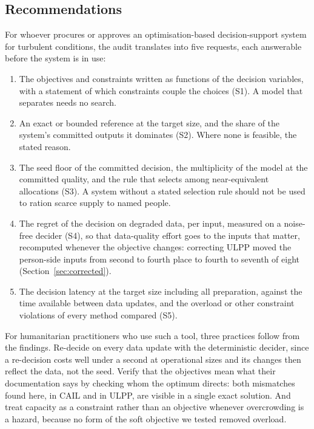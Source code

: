 \documentclass[systems,article,submit,moreauthors,pdftex]{Definitions/mdpi}
\begin{document}
\subsection{Recommendations}\label{sec:recommendations}
For whoever procures or approves an optimisation-based decision-support system for turbulent
conditions, the audit translates into five requests, each answerable before the system is in use:
\begin{enumerate}
\item The objectives and constraints written as functions of the decision variables, with a
statement of which constraints couple the choices (S1). A model that separates needs no search.
\item An exact or bounded reference at the target size, and the share of the system's committed
outputs it dominates (S2). Where none is feasible, the stated reason.
\item The seed floor of the committed decision, the multiplicity of the model at the committed
quality, and the rule that selects among near-equivalent allocations (S3). A system without a
stated selection rule should not be used to ration scarce supply to named people.
\item The regret of the decision on degraded data, per input, measured on a noise-free decider
(S4), so that data-quality effort goes to the inputs that matter, recomputed whenever the
objective changes: correcting ULPP moved the person-side inputs from second to fourth place to
fourth to seventh of eight (Section~\ref{sec:corrected}).
\item The decision latency at the target size including all preparation, against the time
available between data updates, and the overload or other constraint violations of every
method compared (S5).
\end{enumerate}
For humanitarian practitioners who use such a tool, three practices follow from the findings.
Re-decide on every data update with the deterministic decider, since a re-decision costs well
under a second at operational sizes and its changes then reflect the data, not the seed. Verify
that the objectives mean what their documentation says by checking whom the optimum directs:
both mismatches found here, in CAIL and in ULPP, are visible in a single exact solution. And
treat capacity as a constraint rather than an objective whenever overcrowding is a hazard,
because no form of the soft objective we tested removed overload.
\end{document}
